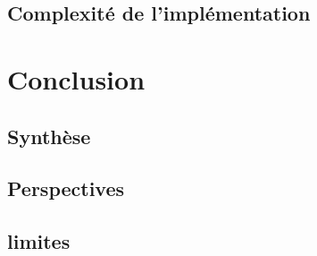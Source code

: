 \documentclass{article}
\begin{document}
        \subsection{Complexité de l'implémentation}\label{subsec:complexite}
    \section{Conclusion}\label{sec:conclusion}
        \subsection{Synthèse}\label{subsec:synthese}
        \subsection{Perspectives}\label{subsec:perspectives}
        \subsection{limites}\label{subsec:limites}
\end{document}
